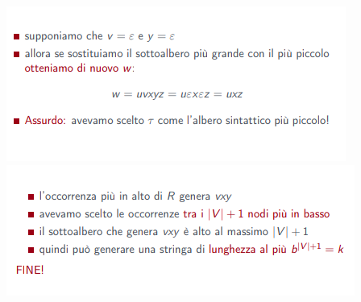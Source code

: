 \documentclass[]{article}
\begin{document}
\begin{center}
				\includegraphics{PLCFG8.png}
				\includegraphics{PLCFG9.png}
			\end{center}
\end{document}
